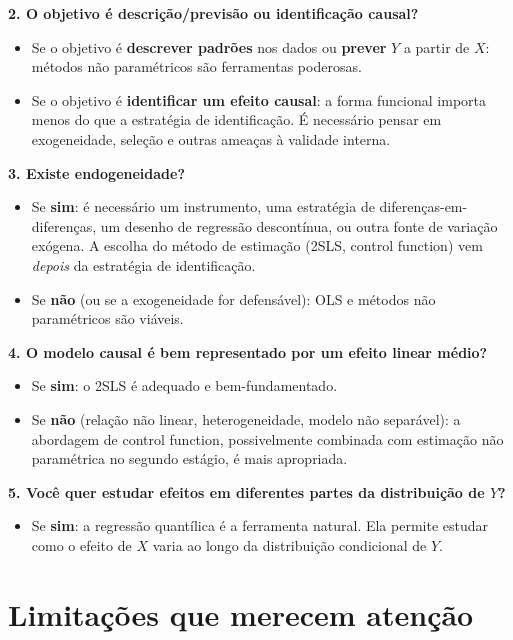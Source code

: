 \textbf{2. O objetivo é descrição/previsão ou identificação causal?}

\begin{itemize}
  \item Se o objetivo é \textbf{descrever padrões} nos dados ou \textbf{prever} $Y$
  a partir de $X$: métodos não paramétricos são ferramentas poderosas.
  \item Se o objetivo é \textbf{identificar um efeito causal}: a forma funcional
  importa menos do que a estratégia de identificação. É necessário pensar em
  exogeneidade, seleção e outras ameaças à validade interna.
\end{itemize}

\textbf{3. Existe endogeneidade?}

\begin{itemize}
  \item Se \textbf{sim}: é necessário um instrumento, uma estratégia de
  diferenças-em-diferenças, um desenho de regressão descontínua, ou outra fonte de
  variação exógena. A escolha do método de estimação (2SLS, control function) vem
  \emph{depois} da estratégia de identificação.
  \item Se \textbf{não} (ou se a exogeneidade for defensável): OLS e métodos
  não paramétricos são viáveis.
\end{itemize}

\textbf{4. O modelo causal é bem representado por um efeito linear médio?}

\begin{itemize}
  \item Se \textbf{sim}: o 2SLS é adequado e bem-fundamentado.
  \item Se \textbf{não} (relação não linear, heterogeneidade, modelo não separável):
  a abordagem de control function, possivelmente combinada com estimação não
  paramétrica no segundo estágio, é mais apropriada.
\end{itemize}

\textbf{5. Você quer estudar efeitos em diferentes partes da distribuição de $Y$?}

\begin{itemize}
  \item Se \textbf{sim}: a regressão quantílica é a ferramenta natural. Ela permite
  estudar como o efeito de $X$ varia ao longo da distribuição condicional de $Y$.
\end{itemize}

\section*{Limitações que merecem atenção}

